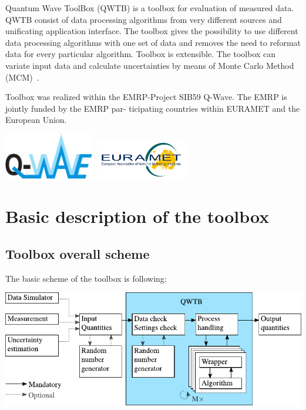 \documentclass[12pt,a4paper,oneside]{report} %
\begin{document}
\bigskip
\noindent Quantum Wave ToolBox (QWTB) is a toolbox for evaluation of measured data. QWTB consist of data
processing algorithms from very different sources and unificating application interface. The toolbox
gives the possibility to use different data processing algorithms with one set of data and removes
the need to reformat data for every particular algorithm. Toolbox is extensible. The toolbox
can variate input data and calculate uncertainties by means of Monte Carlo Method
(MCM)~\cite{JCGM2008}.

Toolbox was realized within the EMRP-Project SIB59 Q-Wave. The EMRP is jointly funded by the EMRP
par- ticipating countries within EURAMET and the European Union.

\vfill
\includegraphics[width=0.3\textwidth]{sources/Q-Wave_logo_01.pdf}
\hfill
\includegraphics[width=0.3\textwidth]{sources/eurametlogo.jpg}


\chapter{Basic description of the toolbox} %
\section{Toolbox overall scheme} %
The basic scheme of the toolbox is following:
\begin{center}
        \includegraphics{sources/basic scheme v2.pdf}
\end{center}
\end{document}

